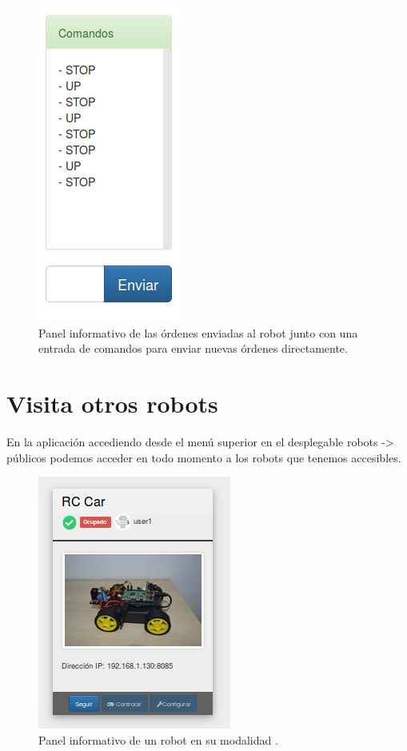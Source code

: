 \begin{figure}[H]
  \begin{center}
    \includegraphics[scale=.6]{imagenes/manual-usuario/panel-comandos.png}
  \end{center}
  \caption{ Panel informativo de las órdenes enviadas al robot junto con una entrada de comandos para enviar nuevas órdenes directamente.}
  \label{website:pagina-principal}
\end{figure}


\section{ Visita otros robots }
\label{sec:visita-robot}


En la aplicación accediendo desde el menú superior en el desplegable robots -> públicos podemos acceder en todo momento a los robots que tenemos accesibles.

\begin{figure}[H]
  \begin{center}
    \includegraphics[scale=.6]{imagenes/manual-usuario/tarjeta_ocupado.png}
  \end{center}
  \caption{ Panel informativo de un robot en su modalidad .}
  \label{website:robot-ocupado}
\end{figure}

